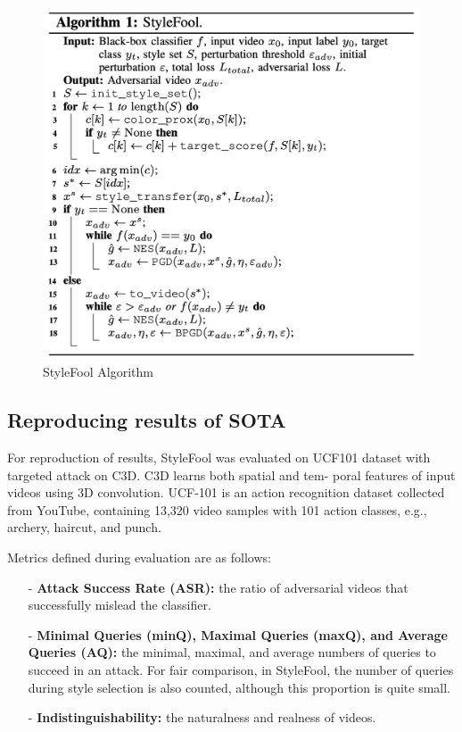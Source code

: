 \begin{figure}[!hbt]
    \centering
    \includegraphics[scale=0.5]{img/algorithm.png}
    \caption{StyleFool Algorithm}
    \label{fig:Figure5}
\end{figure}

\subsection{Reproducing results of SOTA}

For reproduction of results, StyleFool was evaluated on UCF101 dataset with targeted attack on C3D. C3D learns both spatial and tem- poral features of input videos using 3D convolution. UCF-101 is an action recognition dataset collected from YouTube, containing 13,320 video samples with 101 action classes, e.g., archery, haircut, and punch.

Metrics defined during evaluation are as follows:
\begin{itemize}
    \item[-] \textbf{Attack Success Rate (ASR):} the ratio of adversarial videos that successfully mislead the classifier.
    \item[-] \textbf{Minimal Queries (minQ), Maximal Queries (maxQ), and Average Queries (AQ):} the minimal, maximal, and average numbers of queries to succeed in an attack. For fair comparison, in StyleFool, the number of queries during style selection is also counted, although this proportion is quite small.
    \item[-] \textbf{Indistinguishability:} the naturalness and realness of videos. 
\end{itemize}

